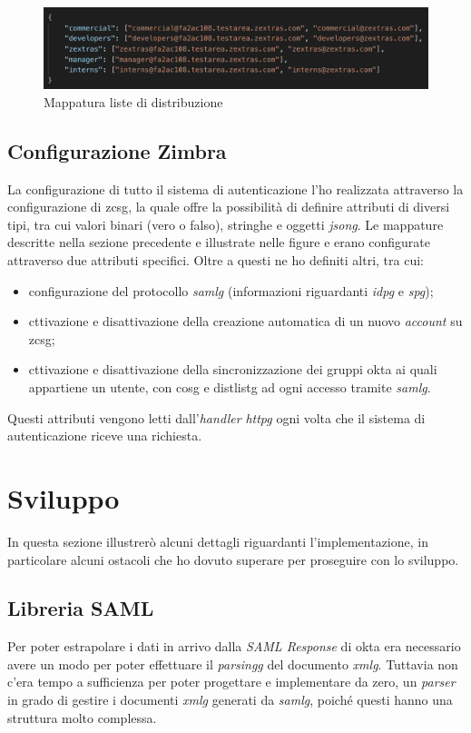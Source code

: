      \begin{figure}[ht]
        \centering
        \includegraphics[width=1\textwidth]{immagini/distListMapping.png}
        \caption{Mappatura liste di distribuzione}
        \label{fig: Mappatura liste di distribuzione}
    \end{figure}

\subsection{Configurazione Zimbra}
La configurazione di tutto il sistema di autenticazione l'ho realizzata attraverso la configurazione di \gls{zcsg}, la quale offre la possibilità di definire attributi di diversi tipi, tra cui valori binari (vero o falso), stringhe e oggetti \textit{\gls{jsong}}. Le mappature descritte nella sezione precedente e illustrate nelle figure  e  erano configurate attraverso due attributi specifici. Oltre a questi ne ho definiti altri, tra cui:
\begin{itemize}
    \item configurazione del protocollo \textit{\gls{samlg}} (informazioni riguardanti \textit{\gls{idpg}} e \textit{\gls{spg}});
    \item cttivazione e disattivazione della creazione automatica di un nuovo \textit{account}  su \gls{zcsg};
    \item cttivazione e disattivazione della sincronizzazione dei gruppi \gls{okta} ai quali appartiene un utente, con \gls{cosg} e \gls{distlistg} ad ogni accesso tramite \textit{\gls{samlg}}.
\end{itemize}
Questi attributi vengono letti dall'\textit{handler} \textit{\gls{httpg}} ogni volta che il sistema di autenticazione riceve una richiesta.

\section{Sviluppo}
In questa sezione illustrerò alcuni dettagli riguardanti l'implementazione, in particolare alcuni ostacoli che ho dovuto superare per proseguire con lo sviluppo.
\subsection{Libreria SAML} \label{sec:libreria}
Per poter estrapolare i dati in arrivo dalla \textit{SAML Response} di \gls{okta} era necessario avere un modo per poter effettuare il \textit{\gls{parsingg}} del documento \textit{\gls{xmlg}}. Tuttavia non c'era tempo a sufficienza per poter progettare e implementare da zero, un \textit{parser} in grado di gestire i documenti \textit{\gls{xmlg}} generati da \textit{\gls{samlg}}, poiché questi hanno una struttura molto complessa.

